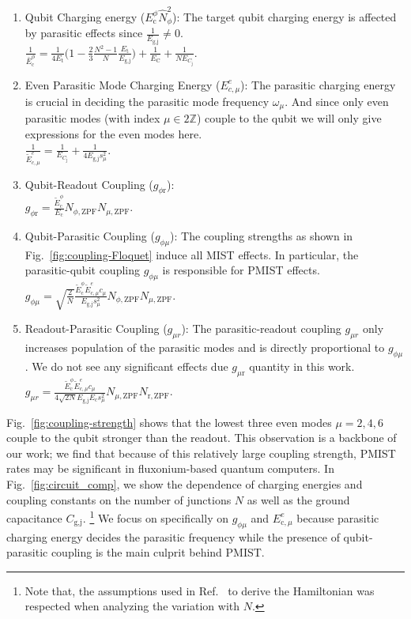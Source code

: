 \documentclass[%
reprint,
superscriptaddress,
 amsmath,amssymb,
 aps,
 prx,
longbibliography,
floatfix,
]{revtex4-2}
\begin{document}
\begin{enumerate}
\item Qubit Charging energy ($E_{\textrm{c}}^\phi \hat N_{\phi}^2$): The target qubit charging energy is affected by parasitic effects since $\frac{1}{E_\textrm{g,j}}\neq 0$.\\ $\frac{1}{\bar{E}_\textrm{c}^\phi}=\frac{1}{4E_{\textrm{t}}}\Big(1-\frac{2}{3}\frac{N^2-1}{N}\frac{E_{\textrm{t}}}{E_{\textrm{g,j}}}\Big)+\frac{1}{E_{\textrm{C}}}+\frac{1}{NE_{C_\textrm{j}}}$.
\item Even Parasitic Mode Charging Energy ($E_{c,\mu}^e$): The parasitic charging energy is crucial in deciding the parasitic mode frequency $\omega_{\mu}$. And since only even parasitic modes (with index $\mu\in 2\mathbb{Z}$) couple to the qubit we will only give expressions for the even modes here.\\ $\frac{1}{\tilde{E}_{c,\mu}^{e}}=\frac{1}{E_{C_\textrm{j}}}+\frac{1}{4E_{\textrm{g,j}}s_\mu^2}.$ 
\item Qubit-Readout Coupling ($g_{\phi \textrm{r}}$):\\ $g_{\phi \textrm{r}}=\frac{\tilde{E}_\textrm{c}^\phi}{E_{\textrm{c}}} N_{\phi,\mathrm{ZPF}}N_{\mu,\mathrm{ZPF}}.$
\item Qubit-Parasitic Coupling ($g_{\phi\mu}$): The coupling strengths as shown in Fig.~\ref{fig:coupling-Floquet} induce all MIST effects. In particular, the parasitic-qubit coupling $g_{\phi\mu}$ is responsible for PMIST effects.\\ $g_{\phi\mu}=\sqrt{\frac{2}{N}} \frac{\tilde{E}^\phi_\textrm{c}\tilde{E}^e_{c,\mu}c_\mu}{E_{\textrm{g,j}}s_\mu^2} N_{\phi,\mathrm{ZPF}} N_{\mu,\mathrm{ZPF}}.$
\item Readout-Parasitic Coupling ($g_{\mu r}$): The parasitic-readout coupling $g_{\mu r}$ only increases population of the parasitic modes and is directly proportional to $g_{\phi\mu}$. We do not see any significant effects due $g_{\mu \textrm{r}}$ quantity in this work.\\ $g_{\mu r}=\frac{\tilde{E}^\phi_\textrm{c}\tilde{E}^e_{c,\mu}c_\mu}{4\sqrt{2N}E_{\textrm{g,j}}E_{\textrm{c}}s_\mu^2} N_{\mu,\mathrm{ZPF}}N_{\textrm{r},\mathrm{ZPF}}.$   
\end{enumerate}

Fig.~\ref{fig:coupling-strength} shows that the lowest three even modes $\mu=2,4,6$ couple to the qubit stronger than the readout. This observation is a backbone of our work; we find that because of this relatively large coupling strength, PMIST rates may be significant in fluxonium-based quantum computers. In Fig.~\ref{fig:circuit_comp}, we show the dependence of charging energies and coupling constants on the number of junctions $N$ as well as the ground capacitance $C_\textrm{g,j}$. \footnote{Note that, the assumptions used in Ref.~\cite{viola2015collective} to derive the Hamiltonian was respected when analyzing the variation with $N$. } We focus on specifically on $g_{\phi\mu}$ and $E_{\textrm{c},\mu}^e$ because parasitic charging energy decides the parasitic frequency while the presence of qubit-parasitic coupling is the main culprit behind PMIST.
\end{document}
